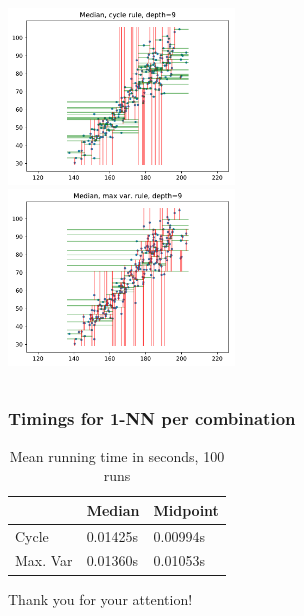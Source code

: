 \documentclass{beamer}
\begin{document}
\begin{frame}
	\begin{columns}[t]
		\centering
		\includegraphics[width=6cm]{graphics/median_cycle}\\
		\centering
		\includegraphics[width=6cm]{graphics/median_maxvar}\\
	\end{columns}
\end{frame}


\begin{frame}
\frametitle{Timings for 1-NN per combination}
\begin{table}[]
	\centering
	\label{my-label}
	\begin{tabular}{l|l|l}
		& Median          & Midpoint        \\ \hline
		Cycle    & 0.01425s & 0.00994s \\ \hline
		Max. Var & 0.01360s & 0.01053s \\ 
	\end{tabular}
	\caption{Mean running time in seconds, 100 runs}
\end{table}
\end{frame}
\begin{frame}
\centering
{\huge Thank you for your attention!}
\end{frame}

%
%

\end{document}
